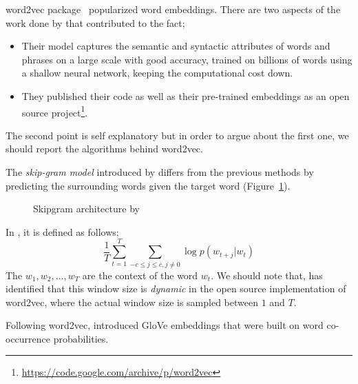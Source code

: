 word2vec package~\cite{mikolov_efficient_2013,mikolov_distributed_2013,mikolov_linguistic_2013} popularized word embeddings.
There are two aspects of the work done by \citeauthor{mikolov_distributed_2013}  that contributed to the fact;
\begin{itemize}
    \item Their model captures the semantic and syntactic attributes of words and phrases on a large scale with good accuracy, trained on billions of words using a shallow neural network, keeping the computational cost down.
    \item They published their code as well as their pre-trained embeddings as an open source project\footnote{\url{https://code.google.com/archive/p/word2vec}}.
\end{itemize}
The second point is self explanatory but in order to argue about the first one, we should report the algorithms behind word2vec.

The \emph{skip-gram model} introduced by \textcite{mikolov_efficient_2013} differs from the previous methods by predicting the surrounding words given the target word (Figure~\ref{fig:skipgram}).

\begin{figure}[htbp]
    \centering
    \caption{Skipgram architecture by \textcite{mikolov_distributed_2013}}%
    \label{fig:skipgram}
\end{figure}

In , it is defined as follows;
\begin{equation}
    \frac{1}{T}\sum_{t=1}^{T}\sum_{-c \leq j \leq c, j \neq 0} \log p(w_{t+j}|w_t)
\end{equation}
The $w_{1}, w_{2}, \dots, w_{T}$ are the context of the word $w_t$.
We should note that, \textcite{levy_improving_2015} has identified that this window size is \emph{dynamic} in the open source implementation of word2vec, where the actual window size is sampled between $1$ and $T$.

Following word2vec, \textcite{pennington_glove_2014} introduced GloVe embeddings that were built on word co-occurrence probabilities.



